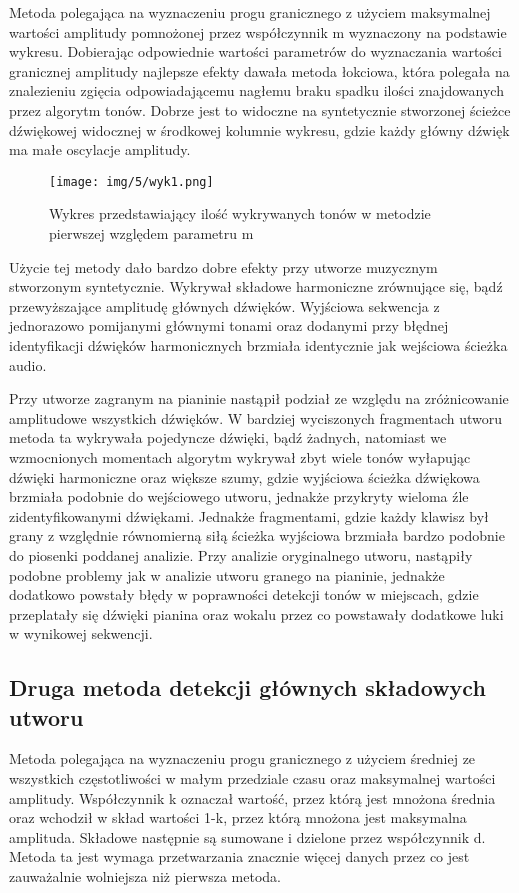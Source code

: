 Metoda polegająca na wyznaczeniu progu granicznego z użyciem maksymalnej wartości amplitudy pomnożonej przez współczynnik m wyznaczony na podstawie wykresu. Dobierając odpowiednie wartości parametrów do wyznaczania wartości granicznej amplitudy najlepsze efekty dawała metoda łokciowa, która polegała na znalezieniu zgięcia odpowiadającemu nagłemu braku spadku ilości znajdowanych przez algorytm tonów. Dobrze jest to widoczne na syntetycznie stworzonej ścieżce dźwiękowej widocznej w środkowej kolumnie wykresu, gdzie każdy główny dźwięk ma małe oscylacje amplitudy.

\begin{figure}[h]
  \centering
  \texttt{[image: img/5/wyk1.png]}
  \caption{Wykres przedstawiający ilość wykrywanych tonów w metodzie pierwszej względem parametru m}
\end{figure}

Użycie tej metody dało bardzo dobre efekty przy utworze muzycznym stworzonym syntetycznie. Wykrywał składowe harmoniczne zrównujące się, bądź przewyższające amplitudę głównych dźwięków. Wyjściowa sekwencja z jednorazowo pomijanymi głównymi tonami oraz dodanymi przy błędnej identyfikacji dźwięków harmonicznych brzmiała identycznie jak wejściowa ścieżka audio. 

Przy utworze zagranym na pianinie nastąpił podział ze względu na zróżnicowanie amplitudowe wszystkich dźwięków. W bardziej wyciszonych fragmentach utworu metoda ta wykrywała pojedyncze dźwięki, bądź żadnych, natomiast we wzmocnionych momentach algorytm wykrywał zbyt wiele tonów wyłapując dźwięki harmoniczne oraz większe szumy, gdzie wyjściowa ścieżka dźwiękowa brzmiała podobnie do wejściowego utworu, jednakże przykryty wieloma źle zidentyfikowanymi dźwiękami. Jednakże fragmentami, gdzie każdy klawisz był grany z względnie równomierną siłą ścieżka wyjściowa brzmiała bardzo podobnie do piosenki poddanej analizie.
Przy analizie oryginalnego utworu, nastąpiły podobne problemy jak w analizie utworu granego na pianinie, jednakże dodatkowo powstały błędy w poprawności detekcji tonów w miejscach, gdzie przeplatały się dźwięki pianina oraz wokalu przez co powstawały dodatkowe luki w wynikowej sekwencji.

\subsection{Druga metoda detekcji głównych składowych utworu}

Metoda polegająca na wyznaczeniu progu granicznego z użyciem średniej ze wszystkich częstotliwości w małym przedziale czasu oraz maksymalnej wartości amplitudy. Współczynnik k oznaczał wartość, przez którą jest mnożona średnia oraz wchodził w skład wartości 1-k, przez którą mnożona jest maksymalna amplituda. Składowe następnie są sumowane i dzielone przez współczynnik d. Metoda ta jest wymaga przetwarzania znacznie więcej danych przez co jest zauważalnie wolniejsza niż pierwsza metoda.

